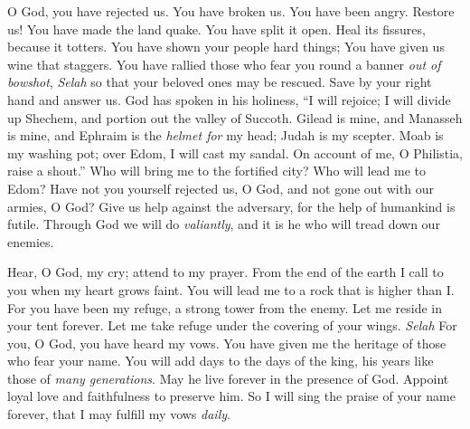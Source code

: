 \begin{biblechapter} %
 O God, you have rejected us. You have broken us. 
You have been angry. Restore us!
\verse You have made the land quake. You have split it open. 
Heal its fissures, because it totters.
\verse You have shown your people hard things; 
You have given us wine that staggers.
\verse You have rallied those who fear you round a banner 
\textit{out of bowshot}, \textit{Selah}
\verse so that your beloved ones may be rescued. 
Save by your right hand and answer us.
\verse God has spoken in his holiness, 
“I will rejoice; 
I will divide up Shechem, 
and portion out the valley of Succoth.
\verse Gilead is mine, and Manasseh is mine, 
and Ephraim is the \textit{helmet for} my head; 
Judah is my scepter.
\verse Moab is my washing pot; 
over Edom, I will cast my sandal. 
On account of me, O Philistia, raise a shout.”
\verse Who will bring me to the fortified city? 
Who will lead me to Edom?
\verse Have not you yourself rejected us, O God, 
and not gone out with our armies, O God?
\verse Give us help against the adversary, 
for the help of humankind is futile.
\verse Through God we will do \textit{valiantly}, 
and it is he who will tread down our enemies.
\end{biblechapter}

\begin{biblechapter} %
 Hear, O God, my cry; 
attend to my prayer.
\verse From the end of the earth I call to you 
when my heart grows faint. 
You will lead me to a rock that is higher than I.
\verse For you have been my refuge, 
a strong tower from the enemy.
\verse Let me reside in your tent forever. 
Let me take refuge under the covering of your wings. \textit{Selah}
\verse For you, O God, you have heard my vows. 
You have given me the heritage of those who fear your name.
\verse You will add days to the days of the king, 
his years like those of \textit{many generations}.
\verse May he live forever in the presence of God. 
Appoint loyal love and faithfulness to preserve him.
\verse So I will sing the praise of your name forever, 
that I may fulfill my vows \textit{daily}.
\end{biblechapter}

